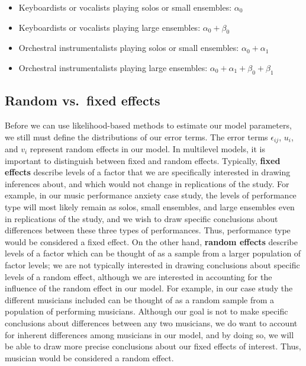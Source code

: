 \documentclass[
]{krantz}
\providecommand{\tightlist}{%
  \setlength{\itemsep}{0pt}\setlength{\parskip}{0pt}}
\begin{document}
\begin{itemize}
\tightlist
\item
  Keyboardists or vocalists playing solos or small ensembles: \(\alpha_{0}\)
\item
  Keyboardists or vocalists playing large ensembles: \(\alpha_{0}+\beta_{0}\)
\item
  Orchestral instrumentalists playing solos or small ensembles: \(\alpha_{0}+\alpha_{1}\)
\item
  Orchestral instrumentalists playing large ensembles: \(\alpha_{0}+\alpha_{1}+\beta_{0}+\beta_{1}\)
\end{itemize}

\hypertarget{random-vs.-fixed-effects}{%
\subsection{Random vs.~fixed effects}\label{random-vs.-fixed-effects}}

Before we can use likelihood-based methods to estimate our model parameters, we still must define the distributions of our error terms. The error terms \(\epsilon_{ij}\), \(u_{i}\), and \(v_{i}\) represent random effects in our model. In multilevel models, it is important to distinguish between fixed and random effects. Typically, \textbf{fixed effects}  describe levels of a factor that we are specifically interested in drawing inferences about, and which would not change in replications of the study. For example, in our music performance anxiety case study, the levels of performance type will most likely remain as solos, small ensembles, and large ensembles even in replications of the study, and we wish to draw specific conclusions about differences between these three types of performances. Thus, performance type would be considered a fixed effect. On the other hand, \textbf{random effects}  describe levels of a factor which can be thought of as a sample from a larger population of factor levels; we are not typically interested in drawing conclusions about specific levels of a random effect, although we are interested in accounting for the influence of the random effect in our model. For example, in our case study the different musicians included can be thought of as a random sample from a population of performing musicians. Although our goal is not to make specific conclusions about differences between any two musicians, we do want to account for inherent differences among musicians in our model, and by doing so, we will be able to draw more precise conclusions about our fixed effects of interest. Thus, musician would be considered a random effect.
\end{document}
